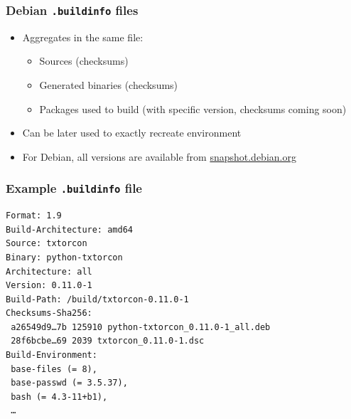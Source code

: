 \documentclass[14pt]{beamer}
\begin{document}
\begin{frame}
 \frametitle{Debian \texttt{.buildinfo} files}

 \begin{itemize}
  \item Aggregates in the same file:
   \begin{itemize}
    \item Sources (checksums)
    \item Generated binaries (checksums)
    \item Packages used to build (with specific version, checksums coming soon)
   \end{itemize}
  \item Can be later used to exactly recreate environment
  \item For Debian, all versions are available from \url{snapshot.debian.org}
 \end{itemize}
\end{frame}


\begin{frame}[fragile]
 \frametitle{Example \texttt{.buildinfo} file}

{\small
\begin{verbatim}
Format: 1.9
Build-Architecture: amd64
Source: txtorcon
Binary: python-txtorcon
Architecture: all
Version: 0.11.0-1
Build-Path: /build/txtorcon-0.11.0-1
Checksums-Sha256:
 a26549d9…7b 125910 python-txtorcon_0.11.0-1_all.deb
 28f6bcbe…69 2039 txtorcon_0.11.0-1.dsc
Build-Environment:
 base-files (= 8),
 base-passwd (= 3.5.37),
 bash (= 4.3-11+b1),
 …
\end{verbatim}
}
\end{frame}
\end{document}
